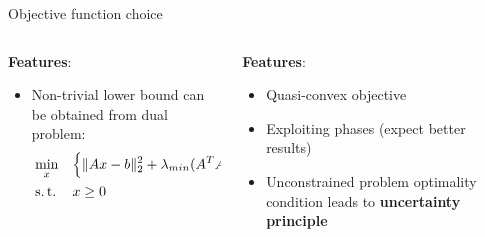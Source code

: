 \documentclass[../main.tex]{subfiles}
\begin{document}
\begin{frame}[t]{Objective function choice}
\begin{columns}[t]
\begin{column}{0.5\textwidth}
    \textbf{Features}:
    \begin{itemize}
        \item Non-trivial lower bound can be obtained from dual problem:
            \begin{equation*}
            \begin{aligned}
            & \min_{x} 
            & & \Big\{\| Ax - b \|_2^2 + \lambda_{min} (A^TA) x^T B x \Big\} \\
            & \operatorname{s.t.}
            & & x \ge 0 \\
            \end{aligned}
            \end{equation*}
    \end{itemize}
    
\end{column}
\begin{column}{0.5\textwidth}
    \textbf{Features}:
    \begin{itemize}
        \item Quasi-convex objective
        \item Exploiting phases (expect better results)
        \item Unconstrained problem optimality condition leads to \textbf{uncertainty principle} 
    \end{itemize}
\end{column}    
\end{columns}


\end{frame}





%
%
\end{document}
